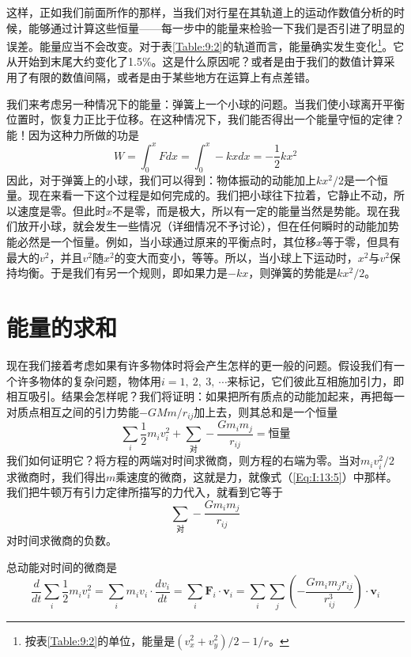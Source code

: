 这样，正如我们前面所作的那样，当我们对行星在其轨道上的运动作数值分析的时候，能够通过计算这些恒量——每一步中的能量来检验一下我们是否引进了明显的误差。能量应当不会改变。对于表\ref{Table:9:2}的轨道而言，能量确实发生变化\footnote{按表\ref{Table:9:2}的单位，能量是$(v_x^2+v_y^2)/2-1/r$。}。它从开始到末尾大约变化了1.5\%。这是什么原因呢？或者是由于我们的数值计算采用了有限的数值间隔，或者是由于某些地方在运算上有点差错。

我们来考虑另一种情况下的能量：弹簧上一个小球的问题。当我们使小球离开平衡位置时，恢复力正比于位移。在这种情况下，我们能否得出一个能量守恒的定律？能！因为这种力所做的功是
\begin{equation}
    \label{Eq:I:13:13}
    W=\int_{0}^{x} Fdx =\int_{0}^{x} -kxdx=-\frac{1}{2}kx^2 
\end{equation}
因此，对于弹簧上的小球，我们可以得到：物体振动的动能加上$kx^2/2$是一个恒量。现在来看一下这个过程是如何完成的。我们把小球往下拉着，它静止不动，所以速度是零。但此时$x$不是零，而是极大，所以有一定的能量当然是势能。现在我们放开小球，就会发生一些情况（详细情况不予讨论），但在任何瞬时的动能加势能必然是一个恒量。例如，当小球通过原来的平衡点时，其位移$x$等于零，但具有最大的$v^2$，并且$v^2$随$x^2$的变大而变小，等等。所以，当小球上下运动时，$x^2$与$v^2$保持均衡。于是我们有另一个规则，即如果力是$-kx$，则弹簧的势能是$kx^2/2$。

\section{能量的求和}

现在我们接着考虑如果有许多物体时将会产生怎样的更一般的问题。假设我们有一个许多物体的复杂问题，物体用$i=1,~2,~3,~\cdots$来标记，它们彼此互相施加引力，即相互吸引。结果会怎样呢？我们将证明：如果把所有质点的动能加起来，再把每一对质点相互之间的引力势能$-GMm/r_{ij}$加上去，则其总和是一个恒量
\begin{equation}
    \label{Eq:I:13:14}
    \sum_{i} \frac{1}{2}m_iv_i^2 + \sum_{\text{对}} -\frac{Gm_im_j}{r_{ij}}=\text{恒量}
\end{equation}
我们如何证明它？将方程的两端对时间求微商，则方程的右端为零。当对$m_iv_i^2/2$求微商时，我们得出$m$乘速度的微商，这就是力，就像式（\ref{Eq:I:13:5}）中那样。我们把牛顿万有引力定律所描写的力代入，就看到它等于
\begin{equation*}
    \sum_{\text{对}} -\frac{Gm_im_j}{r_{ij}}
\end{equation*}
对时间求微商的负数。

总动能对时间的微商是
\begin{equation}
    \label{Eq:I:13:15}
    \frac{d}{dt} \sum_{i} \frac{1}{2}m_iv_i^2 = \sum_i m_iv_i \cdot \frac{dv_i}{dt} = \sum_i \boldsymbol{F}_i \cdot \boldsymbol{v}_i = \sum_i \sum_j (-\frac{Gm_im_jr_{ij}}{r_{ij}^3}) \cdot \boldsymbol{v}_i
\end{equation}

